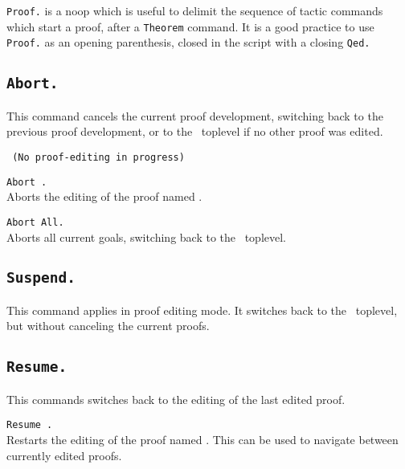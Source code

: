 \begin{Variants}
\item{\tt Proof.} is a noop which is useful to delimit the sequence of
tactic commands which start a proof, after a {\tt Theorem} command.
It is a good practice to use {\tt Proof.} as an opening parenthesis,
closed in the script with a closing {\tt Qed.}
\end{Variants}

\subsection{\tt Abort.}
This command cancels the current proof development, switching back to
the previous proof development, or to the \Coq\ toplevel if no other
proof was edited.

\begin{ErrMsgs}
\item {}\texttt{ (No proof-editing in progress)}
\end{ErrMsgs}

\begin{Variants}
\item {\tt Abort {\ident}.}\\
  Aborts the editing of the proof named {\ident}.
\item {\tt Abort All.}\\
  Aborts all current goals, switching back to the \Coq\ toplevel.
\end{Variants}

\subsection{\tt Suspend.}
This command applies in proof editing mode. It switches back to the
\Coq\ toplevel, but without canceling the current proofs.

\subsection{\tt Resume.}
\label{Resume}
This commands switches back to the editing of the last edited proof.

\begin{ErrMsgs}
\item {}
\end{ErrMsgs}

\begin{Variants}
\item {\tt Resume {\ident}.}\\
  Restarts the editing of the proof named {\ident}. This can be used
  to navigate between currently edited proofs.
\end{Variants}

